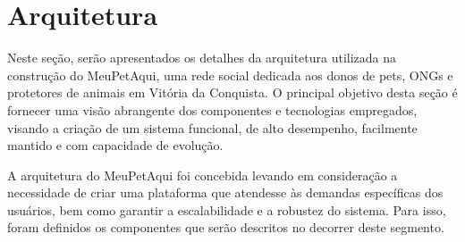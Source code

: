 \newpage
\section{Arquitetura}

Neste seção, serão apresentados os detalhes da arquitetura utilizada na construção do MeuPetAqui, uma rede social dedicada aos donos de pets, ONGs e protetores de animais em Vitória da Conquista. O principal objetivo desta seção é fornecer uma visão abrangente dos componentes e tecnologias empregados, visando a criação de um sistema funcional, de alto desempenho, facilmente mantido e com capacidade de evolução.

A arquitetura do MeuPetAqui foi concebida levando em consideração a necessidade de criar uma plataforma que atendesse às demandas específicas dos usuários, bem como garantir a escalabilidade e a robustez do sistema. Para isso, foram definidos os componentes que serão descritos no decorrer deste segmento.
